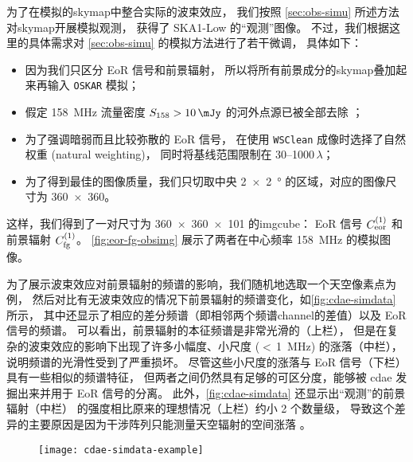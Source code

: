 为了在模拟的\ac{skymap}中整合实际的波束效应，
我们按照 \autoref{sec:obs-simu} 所述方法对\ac{skymap}开展模拟观测，
获得了 SKA1-Low 的\enquote{观测}图像。
不过，我们根据这里的具体需求对 \autoref{sec:obs-simu} 的模拟方法进行了若干微调，
具体如下：
\begin{itemize}
  \item 因为我们只区分 EoR 信号和前景辐射，
    所以将所有前景成分的\ac{skymap}叠加起来再输入 \texttt{OSKAR} 模拟；
  \item 假定 \SI{158}{\MHz} 流量密度 $S_{158} > \SI{10}{\mJy}$
    的河外点源已被全部去除 \cite{liu2009ps}；
  \item 为了强调暗弱而且比较弥散的 EoR 信号，
    在使用 \texttt{WSClean} 成像时选择了自然权重 (natural weighting)，
    同时将基线范围限制在 \numrange{30}{1000}$\,\lambda$；
  \item 为了得到最佳的图像质量，我们只切取中央 \SI{2 x 2}{\degree}
    的区域，对应的图像尺寸为 \num{360 x 360}。
\end{itemize}
这样，我们得到了一对尺寸为 \num{360 x 360 x 101} 的\ac{imgcube}：
EoR 信号 $C_{\mathrm{eor}}^{(1)}$ 和前景辐射 $C_{\mathrm{fg}}^{(1)}$。
\autoref{fig:eor-fg-obsimg} 展示了两者在中心频率 \SI{158}{\MHz} 的模拟图像。

为了展示波束效应对前景辐射的频谱的影响，我们随机地选取一个天空像素点为例，
然后对比有无波束效应的情况下前景辐射的频谱变化，如\autoref{fig:cdae-simdata} 所示，
其中还显示了相应的差分频谱（即相邻两个频谱\ac{channel}的差值）以及 EoR 信号的频谱。
可以看出，前景辐射的本征频谱是非常光滑的（上栏），
但是在复杂的波束效应的影响下出现了许多小幅度、小尺度 ($<$\,\SI{1}{\MHz}) 的涨落（中栏），
说明频谱的光滑性受到了严重损坏。
尽管这些小尺度的涨落与 EoR 信号（下栏）具有一些相似的频谱特征，
但两者之间仍然具有足够的可区分度，能够被 \ac{cdae} 发掘出来并用于 EoR 信号的分离。
此外，\autoref{fig:cdae-simdata} 还显示出\enquote{观测}的前景辐射（中栏）
的强度相比原来的理想情况（上栏）约小 2 个数量级，
导致这个差异的主要原因是因为干涉阵列只能测量天空辐射的空间涨落 \cite{braun1985}。

\begin{figure}[htp]
  \centering
  \texttt{[image: cdae-simdata-example]}
  \label{fig:cdae-simdata}
\end{figure}

